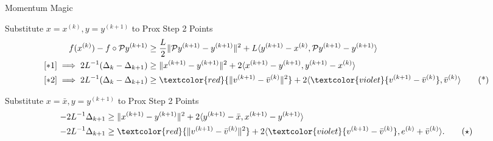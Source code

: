 \documentclass[11pt]{beamer}
\begin{document}
        \begin{frame}{Momentum Magic}
            \begin{block}{Substitute $x = x^{(k)}, y = y^{(k + 1)}$ to Prox Step 2 Points}
                {\scriptsize
                    \begin{align*}
                        f(x^{(k)}) - f\circ \mathcal Py^{(k + 1)}
                        &\ge 
                        \frac{L}{2}\Vert \mathcal Py^{(k + 1)} - y^{(k + 1)}\Vert^2 + 
                        L \langle y^{(k + 1)} - x^{(k)}, \mathcal P y^{(k + 1)} - y^{(k + 1)}\rangle 
                        \\
                        [*1]\implies
                        2L^{-1} (\Delta_k - \Delta_{k + 1}) 
                        &\ge 
                        \Vert x^{(k + 1)} - y^{(k + 1)}\Vert^2 + 
                        2 \langle x^{(k + 1)} - y^{(k + 1)}, y^{(k + 1)} - x^{(k)}\rangle
                        \\
                        [*2]\implies
                        2L^{-1} (\Delta_k - \Delta_{k + 1})  
                        & \ge 
                        \textcolor{red}
                        {
                            \Vert 
                                v^{(k + 1)} - \bar v^{(k)}
                            \Vert^2
                        }
                        + 
                        2\langle \textcolor{violet}{v^{(k + 1)} - \bar v^{(k)}}, \bar v^{(k)}\rangle
                        \tag{*}
                    \end{align*}
                }
            \end{block}
            \begin{block}{Substitute $x = \bar x, y = y^{(k + 1)}$ to Prox Step 2 Points}
                {\scriptsize
                    \begin{align*}
                        -2L^{-1}\Delta_{k + 1} 
                        &\ge 
                        \Vert x^{(k + 1)} - y^{(k + 1)}\Vert^2 + 2
                        \langle y^{(k + 1)} - \bar x, x^{(k + 1)} - y^{(k + 1)}\rangle
                        \\
                        -2L^{-1}\Delta_{k + 1} 
                        & \ge 
                        \textcolor{red}
                        {
                            \Vert 
                                v^{(k + 1)} - \bar v^{(k)}
                            \Vert^2
                        } + 
                        2\langle  
                            \textcolor{violet}{v^{(k + 1)} - \bar v^{(k)}},
                            e^{(k)} + \bar v^{(k)}
                        \rangle.
                        \tag{$\star$}
                    \end{align*}
                }
            \end{block}
        \end{frame}
\end{document}
